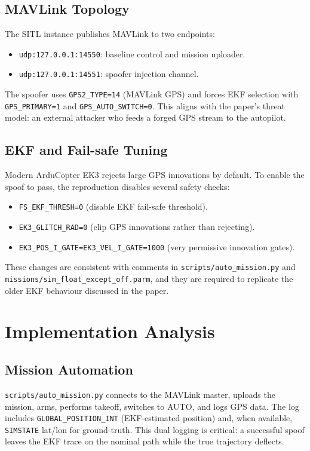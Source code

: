 \documentclass[12pt, a4paper]{article}
\begin{document}
\subsection{MAVLink Topology}
The SITL instance publishes MAVLink to two endpoints:
\begin{itemize}[noitemsep]
  \item \texttt{udp:127.0.0.1:14550}: baseline control and mission uploader.
  \item \texttt{udp:127.0.0.1:14551}: spoofer injection channel.
\end{itemize}

The spoofer uses \texttt{GPS2\_TYPE=14} (MAVLink GPS) and forces EKF selection with \texttt{GPS\_PRIMARY=1} and \texttt{GPS\_AUTO\_SWITCH=0}. This aligns with the paper's threat model: an external attacker who feeds a forged GPS stream to the autopilot.

\subsection{EKF and Fail-safe Tuning}
Modern ArduCopter EK3 rejects large GPS innovations by default. To enable the spoof to pass, the reproduction disables several safety checks:
\begin{itemize}[noitemsep]
  \item \texttt{FS\_EKF\_THRESH=0} (disable EKF fail-safe threshold).
  \item \texttt{EK3\_GLITCH\_RAD=0} (clip GPS innovations rather than rejecting).
  \item \texttt{EK3\_POS\_I\_GATE=EK3\_VEL\_I\_GATE=1000} (very permissive innovation gates).
\end{itemize}
These changes are consistent with comments in \texttt{scripts/auto\_mission.py} and \texttt{missions/sim\_float\_except\_off.parm}, and they are required to replicate the older EKF behaviour discussed in the paper.

\section{Implementation Analysis}

\subsection{Mission Automation}
\texttt{scripts/auto\_mission.py} connects to the MAVLink master, uploads the mission, arms, performs takeoff, switches to AUTO, and logs GPS data. The log includes \texttt{GLOBAL\_POSITION\_INT} (EKF-estimated position) and, when available, \texttt{SIMSTATE} lat/lon for ground-truth. This dual logging is critical: a successful spoof leaves the EKF trace on the nominal path while the true trajectory deflects.
\end{document}
